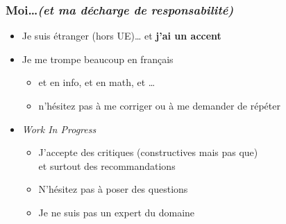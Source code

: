 \documentclass[12pt,svgnames]{beamer}
\subtitle{\Huge Introduction et Rappel}
\date{CM0}
\begin{document}
\begin{frame}
	\titlepage
\end{frame}


\begin{frame}
	\frametitle{Moi\ldots \textit{\small (et ma décharge de responsabilité)}}
	\begin{itemize}
		\item Je suis étranger (hors UE)… et \textbf{j'ai un accent}
		\item Je me {\color{blue} trompe beaucoup} en français
		\begin{itemize}
			\item et en info, et en math, et \ldots
			\item n'hésitez pas à me corriger ou à me demander de répéter
		\end{itemize}
		\item \textit{Work In Progress}
		\begin{itemize}
			\item J'accepte des critiques (constructives mais pas que)\\
			et surtout des recommandations
			\item N'hésitez pas à poser des questions
			\item Je ne suis pas un expert du domaine
		\end{itemize}
	\end{itemize}
\end{frame}
\end{document}
